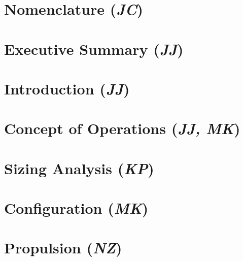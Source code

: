 \documentclass[conf]{new-aiaa}
\begin{document}
\newpage

\section*{Nomenclature (\textit{JC})}



\newpage \setcounter{section}{0}
\doublespacing

\section{Executive Summary (\textit{JJ})}
\label{section: Exec Summary}



\section{Introduction (\textit{JJ})}
\label{section: Intro}


\clearpage
\section{Concept of Operations (\textit{JJ, MK})}
\label{section: Conops}


\clearpage
\section{Sizing Analysis (\textit{KP})}
\label{section: Sizing Analysis}


\clearpage
\section{Configuration (\textit{MK})}
\label{section: Configuration}


\clearpage
\section{Propulsion (\textit{NZ})}
\label{section: Propulsion}

\end{document}
